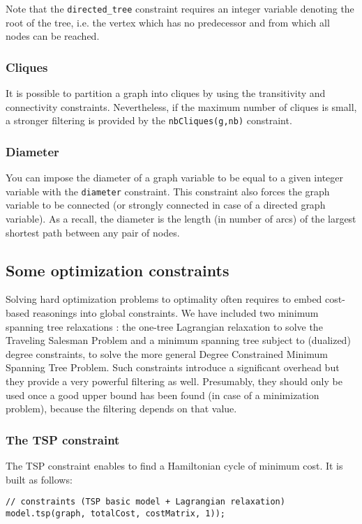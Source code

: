 \documentclass{article}
\begin{document}
Note that the \texttt{directed\_tree} constraint requires an integer variable denoting the root of the tree, i.e. the vertex which has no predecessor and from which all nodes can be reached. 

\subsubsection{Cliques}

It is possible to partition a graph into cliques by using the transitivity and connectivity constraints. Nevertheless, if the maximum number of cliques is small, a stronger filtering is provided by the \texttt{nbCliques(g,nb)} constraint. 

\subsubsection{Diameter}

You can impose the diameter of a graph variable to be equal to a given integer variable with the \texttt{diameter} constraint. This constraint also forces the graph variable to be connected (or strongly connected in case of a directed graph variable). As a recall, the diameter is the length (in number of arcs) of the largest shortest path between any pair of nodes. 

\subsection{Some optimization constraints}

Solving hard optimization problems to optimality often requires to embed cost-based reasonings into global constraints. 
We have included two minimum spanning tree relaxations : the one-tree Lagrangian relaxation to solve the Traveling Salesman Problem and a minimum spanning tree subject to (dualized) degree constraints, to solve the more general Degree Constrained Minimum Spanning Tree Problem. Such constraints introduce a significant overhead but they provide a very powerful filtering as well. Presumably, they should only be used once a good upper bound has been found (in case of a minimization problem), because the filtering depends on that value. 

\subsubsection{The TSP constraint}

The TSP constraint enables to find a Hamiltonian cycle of minimum cost. It is built as follows:
\begin{lstlisting}
// constraints (TSP basic model + Lagrangian relaxation)
model.tsp(graph, totalCost, costMatrix, 1));
\end{lstlisting}
\end{document}
